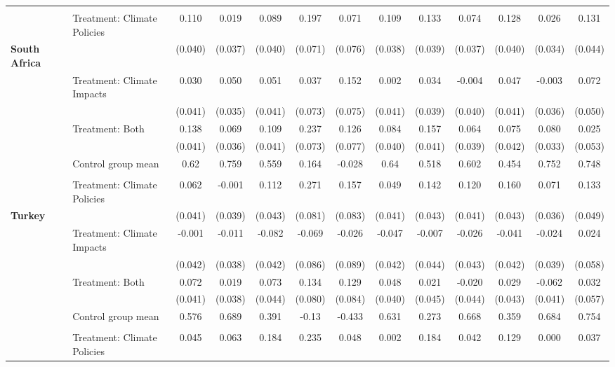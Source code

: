 \begin{tabular}[t]{llccccccccccc}
 &  &  &  &  &  &  &  &  &  &  &  & \\
 & Treatment: Climate Policies & 0.110 & 0.019 & 0.089 & 0.197 & 0.071 & 0.109 & 0.133 & 0.074 & 0.128 & 0.026 & 0.131\\
\textbf{South Africa} &  & (0.040) & (0.037) & (0.040) & (0.071) & (0.076) & (0.038) & (0.039) & (0.037) & (0.040) & (0.034) & (0.044)\\
 & Treatment: Climate Impacts & 0.030 & 0.050 & 0.051 & 0.037 & 0.152 & 0.002 & 0.034 & -0.004 & 0.047 & -0.003 & 0.072\\
 &  & (0.041) & (0.035) & (0.041) & (0.073) & (0.075) & (0.041) & (0.039) & (0.040) & (0.041) & (0.036) & (0.050)\\
 & Treatment: Both & 0.138 & 0.069 & 0.109 & 0.237 & 0.126 & 0.084 & 0.157 & 0.064 & 0.075 & 0.080 & 0.025\\
 &  & (0.041) & (0.036) & (0.041) & (0.073) & (0.077) & (0.040) & (0.041) & (0.039) & (0.042) & (0.033) & (0.053)\\
\midrule
 & Control group mean & 0.62 & 0.759 & 0.559 & 0.164 & -0.028 & 0.64 & 0.518 & 0.602 & 0.454 & 0.752 & 0.748\\
 &  &  &  &  &  &  &  &  &  &  &  & \\
 & Treatment: Climate Policies & 0.062 & -0.001 & 0.112 & 0.271 & 0.157 & 0.049 & 0.142 & 0.120 & 0.160 & 0.071 & 0.133\\
\textbf{Turkey} &  & (0.041) & (0.039) & (0.043) & (0.081) & (0.083) & (0.041) & (0.043) & (0.041) & (0.043) & (0.036) & (0.049)\\
 & Treatment: Climate Impacts & -0.001 & -0.011 & -0.082 & -0.069 & -0.026 & -0.047 & -0.007 & -0.026 & -0.041 & -0.024 & 0.024\\
 &  & (0.042) & (0.038) & (0.042) & (0.086) & (0.089) & (0.042) & (0.044) & (0.043) & (0.042) & (0.039) & (0.058)\\
 & Treatment: Both & 0.072 & 0.019 & 0.073 & 0.134 & 0.129 & 0.048 & 0.021 & -0.020 & 0.029 & -0.062 & 0.032\\
 &  & (0.041) & (0.038) & (0.044) & (0.080) & (0.084) & (0.040) & (0.045) & (0.044) & (0.043) & (0.041) & (0.057)\\
\midrule
 & Control group mean & 0.576 & 0.689 & 0.391 & -0.13 & -0.433 & 0.631 & 0.273 & 0.668 & 0.359 & 0.684 & 0.754\\
 &  &  &  &  &  &  &  &  &  &  &  & \\
 & Treatment: Climate Policies & 0.045 & 0.063 & 0.184 & 0.235 & 0.048 & 0.002 & 0.184 & 0.042 & 0.129 & 0.000 & 0.037\\

\end{tabular}
